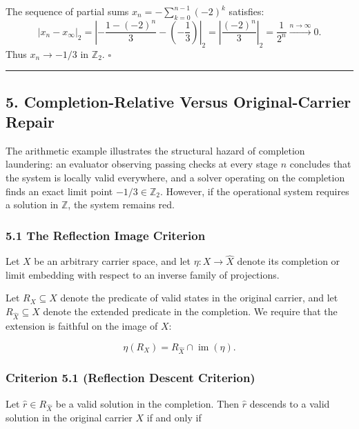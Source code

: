 \documentclass[
  11pt,
]{article}
\theoremstyle{plain}
\theoremstyle{definition}\newtheorem{definition}[theorem]{Definition}
\theoremstyle{remark}\newtheorem*{remark}{Remark}
\begin{document}
The sequence of partial sums \(x_n = -\sum_{k=0}^{n-1} (-2)^k\)
satisfies: \[
|x_n - x_\infty|_2 = \left| -\frac{1 - (-2)^n}{3} - \left(-\frac{1}{3}\right) \right|_2 = \left| \frac{(-2)^n}{3} \right|_2 = \frac{1}{2^n} \xrightarrow{n \to \infty} 0.
\] Thus \(x_n \to -1/3\) in \(\mathbb{Z}_2\). \(\square\)

\begin{center}\rule{0.5\linewidth}{0.5pt}\end{center}

\subsection{5. Completion-Relative Versus Original-Carrier
Repair}\label{completion-relative-versus-original-carrier-repair}

The arithmetic example illustrates the structural hazard of completion
laundering: an evaluator observing passing checks at every stage \(n\)
concludes that the system is locally valid everywhere, and a solver
operating on the completion finds an exact limit point
\(-1/3 \in \mathbb{Z}_2\). However, if the operational system requires a
solution in \(\mathbb{Z}\), the system remains red.

\subsubsection{5.1 The Reflection Image
Criterion}\label{the-reflection-image-criterion}

Let \(X\) be an arbitrary carrier space, and let
\(\eta: X \to \widehat{X}\) denote its completion or limit embedding
with respect to an inverse family of projections.

Let \(R_X \subseteq X\) denote the predicate of valid states in the
original carrier, and let \(R_{\widehat{X}} \subseteq \widehat{X}\)
denote the extended predicate in the completion. We require that the
extension is faithful on the image of \(X\):

\[
\eta(R_X) = R_{\widehat{X}} \cap \operatorname{im}(\eta).
\]

\subsubsection{Criterion 5.1 (Reflection Descent
Criterion)}\label{criterion-5.1-reflection-descent-criterion}

Let \(\hat{r} \in R_{\widehat{X}}\) be a valid solution in the
completion. Then \(\hat{r}\) descends to a valid solution in the
original carrier \(X\) if and only if
\end{document}
